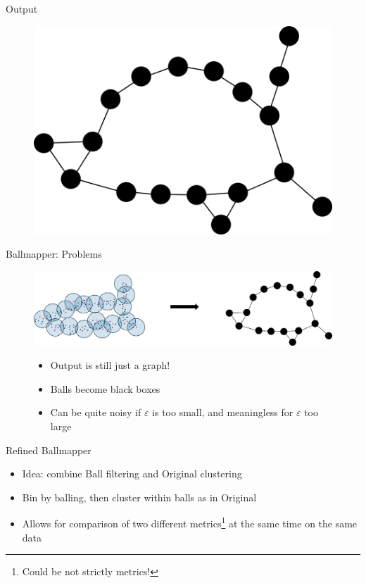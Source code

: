 \documentclass{beamer}
\begin{document}
\begin{frame}{Output}
  \begin{figure}
    \begin{center}
      \includegraphics[width=1\textwidth]{ballmapperposter.png}
    \end{center}
  \end{figure}
\end{frame}

\begin{frame}{Ballmapper: Problems}
  \begin{figure}
    \begin{center}
      \includegraphics[width=1\textwidth]{ballmapperarrow.png}
    \end{center}
    \begin{itemize}
      \item Output is still just a graph!
      \item Balls become black boxes
      \item Can be quite noisy if $\varepsilon$ is too small, and meaningless for $\varepsilon$ too large
    \end{itemize}
  \end{figure}
\end{frame}

\begin{frame}{Refined Ballmapper}
  \begin{itemize}
    \item Idea: combine Ball filtering and Original clustering
    \item Bin by balling, then cluster within balls as in Original
    \item Allows for comparison of two different metrics\footnote{Could be not strictly metrics!} at the same time on the same data
  \end{itemize}
  
\end{frame}
\end{document}
